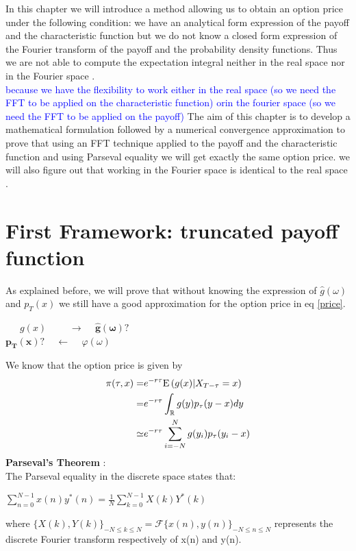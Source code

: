 \documentclass[12pt]{report}
\begin{document}
In this chapter we will introduce a method allowing us to obtain an option price under the following condition: we have an analytical form expression of the payoff and the characteristic function but we do not know a closed form expression of the Fourier transform of the payoff and the probability density functions. Thus we are not able to compute the expectation integral neither in the real space nor in the Fourier space .\\ 

\textcolor{blue}{because we have the flexibility to work either in the real space (so we need the FFT to be applied on the characteristic function) orin the fourier space (so we need the FFT to be applied on the payoff) } 
The aim of this chapter is to develop a mathematical formulation followed by a numerical convergence approximation to prove that using an FFT technique applied to the payoff and the characteristic function and using Parseval equality we will get exactly the same option price.  we will also figure out that working in the Fourier space is identical to the real space .

\section{First Framework: truncated payoff function}

As explained before, we will prove that without knowing the expression of $\hat g (\omega)$ and $p_T(x)$ we still have a good approximation for the option price in eq \eqref{price}.

\begin{center}
 
~~~$g(x)$ ~~~~$\rightarrow$  ~  $ \mathbf{\hat g (\omega) ? }$\\
$\mathbf{{p_T}(x) ?}$ ~  $\leftarrow$ ~  $ \varphi (\omega)$
\end{center}

We know that the option price is given by 
\begin{align*}
\pi(\tau,x)= & e^{-r\tau} \mathrm{E} \left( {{g(x)|X_{T-\tau} = x}} \right)\\
\label{ff}
=& e^{-r\tau} \int_{\mathbb{R}}g(y)p_{\tau}(y-x)dy \\
\simeq  & e^{-r\tau} \sum_{i=-N}^{N}g(y_i)p_{\tau} (y_i-x)
\end{align*}
\textbf{Parseval's Theorem } : \\
The Parseval equality in the discrete space states that: 
\begin{center}
\label{sum}
$\sum \limits_{n=0}^{N-1} x(n)y^*(n)= \frac{1}{N} \sum \limits_{k=0}^{N-1} X(k)Y^*(k)$
\end{center} 
where $\{X(k), Y(k)\}_{-N \leq k \leq N} = \mathcal{F} \{ x(n),y(n)\}_{-N \leq n \leq N} $ represents the discrete  Fourier transform respectively of x(n) and y(n).\\
\end{document}
